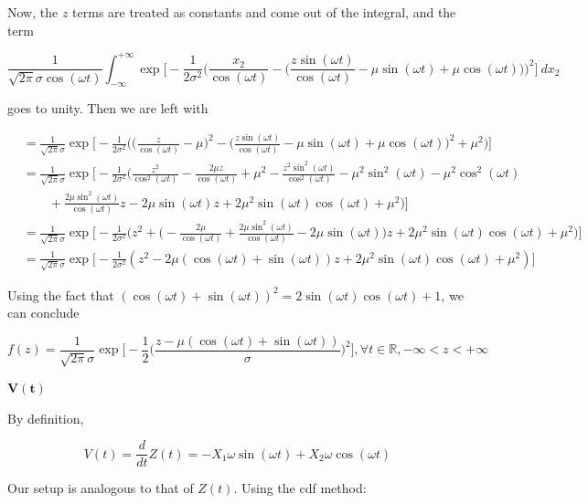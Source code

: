 \documentclass[10pt, oneside]{article}
\begin{document}
\begin{enumerate}[label=9.\arabic*]
\begin{enumerate}
	Now, the $z$ terms are treated as constants and come out of the integral, and the term
	
	\[  \frac{1}{\sqrt{2\pi} \sigma \cos (\omega t)} \int^{+\infty}_{-\infty} \exp \bigg[ -\frac{1}{2 \sigma^2} \bigg( \frac{x_2}{\cos(\omega t)} - \bigg( \frac{z \sin(\omega t)}{\cos(\omega t)} - \mu \sin(\omega t) + \mu \cos(\omega t) \bigg) \bigg)^2 \bigg] \ dx_2 \]
	
	goes to unity. Then we are left with
	
	\begin{align*}
	&= \frac{1}{\sqrt{2\pi} \sigma } \exp \bigg[ -\frac{1}{2 \sigma^2} \bigg( \bigg( \frac{z}{\cos(\omega t)} - \mu \bigg)^2 - \bigg( \frac{z \sin (\omega t)}{\cos (\omega t)} - \mu \sin(\omega t) + \mu \cos(\omega t) \bigg)^2 + \mu^2 \bigg) \bigg] \\
	&= \frac{1}{\sqrt{2\pi} \sigma } \exp \bigg[ -\frac{1}{2 \sigma^2} \bigg( \frac{z^2}{\cos^2(\omega t)} - \frac{2\mu z}{\cos(\omega t)} + \mu^2 - \frac{z^2 \sin^2 (\omega t)}{\cos^2 (\omega t)} - \mu^2 \sin^2(\omega t) - \mu^2 \cos^2(\omega t) \\
	&\quad \quad + \frac{2\mu \sin^2(\omega t)}{\cos(\omega t)} z - 2\mu \sin(\omega t) z + 2\mu^2 \sin(\omega t) \cos(\omega t) + \mu^2 \bigg) \bigg] \\
	&=  \frac{1}{\sqrt{2\pi} \sigma } \exp \bigg[ -\frac{1}{2 \sigma^2} \bigg( z^2 + \bigg( - \frac{2\mu}{\cos(\omega t)} + \frac{2\mu \sin^2(\omega t)}{\cos(\omega t)} - 2\mu \sin(\omega t) \bigg) z + 2\mu^2 \sin(\omega t) \cos(\omega t) + \mu^2 \bigg) \bigg] \\
	&=  \frac{1}{\sqrt{2\pi} \sigma } \exp \bigg[ -\frac{1}{2 \sigma^2} ( z^2 - 2\mu (\cos(\omega t) + \sin(\omega t)) z + 2\mu^2 \sin(\omega t) \cos(\omega t) + \mu^2 ) \bigg]
	\end{align*}
	
	Using the fact that $(\cos(\omega t) + \sin(\omega t))^2 = 2 \sin(\omega t) \cos(\omega t) + 1$, we can conclude
	
	\[ \boxed{f(z) = \frac{1}{\sqrt{2\pi} \sigma} \exp \bigg[ -\frac{1}{2} \bigg( \frac{z - \mu(\cos(\omega t) + \sin(\omega t))}{\sigma} \bigg)^2  \bigg], \forall t \in \mathbb{R}, -\infty < z < +\infty } \]
	
	$\bm{V(t)}$
	
	By definition,
	
	\[ V(t) = \frac{d}{dt} Z(t) = -X_1 \omega \sin(\omega t) + X_2 \omega \cos(\omega t) \]
	
	Our setup is analogous to that of $Z(t)$. Using the cdf method:
	

\end{enumerate}
\end{enumerate}
\end{document}
